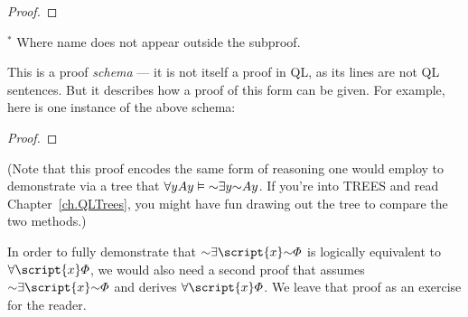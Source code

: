 \begin{proof}
	 
	\open
		\open
			\open
			\close
		\close
		\close
\end{proof}
$^\ast$ Where name  does not appear outside the subproof.

This is a proof \emph{schema} --- it is not itself a proof in QL, as its lines are not QL sentences. But it describes how a proof of this form can be given. For example, here is one instance of the above schema:


\begin{proof}
	 
	\open
		\open
			\open
			\close
		\close
	\close
\end{proof}

(Note that this proof encodes the same form of reasoning one would employ to demonstrate via a tree that $\qt{\forall}{y} Ay \models \enot \qt{\exists}{y} \enot Ay$. If you're into TREES and read Chapter~\ref{ch.QLTrees}, you might have fun drawing out the tree to compare the two methods.)

In order to fully demonstrate that $\enot\qt{\exists}{\script{x}}\enot\metaA{}$ is logically equivalent to $\qt{\forall}{\script{x}}\metaA{}$, we would also need a second proof that assumes $\enot\qt{\exists}{\script{x}}\enot\metaA{}$ and derives $\qt{\forall}{\script{x}}\metaA{}$. We leave that proof as an exercise for the reader.

